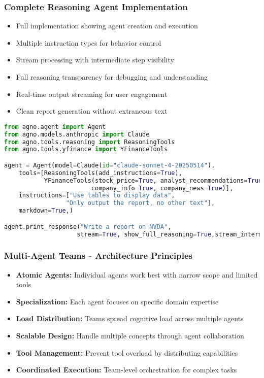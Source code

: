 \begin{frame}[fragile]\frametitle{Complete Reasoning Agent Implementation}
      \begin{itemize}
	\item Full implementation showing agent creation and execution
	\item Multiple instruction types for behavior control
	\item Stream processing with intermediate step visibility
	\item Full reasoning transparency for debugging and understanding
	\item Real-time output streaming for user engagement
	\item Clean report generation without extraneous text
	  \end{itemize}
      
      \begin{lstlisting}[language=python, basicstyle=\tiny]
from agno.agent import Agent
from agno.models.anthropic import Claude
from agno.tools.reasoning import ReasoningTools
from agno.tools.yfinance import YFinanceTools

agent = Agent(model=Claude(id="claude-sonnet-4-20250514"),
    tools=[ReasoningTools(add_instructions=True),
           YFinanceTools(stock_price=True, analyst_recommendations=True,
                        company_info=True, company_news=True)],
    instructions=["Use tables to display data",
                 "Only output the report, no other text"],
    markdown=True,)

agent.print_response("Write a report on NVDA",
                    stream=True, show_full_reasoning=True,stream_intermediate_steps=True)
      \end{lstlisting}
\end{frame}

\begin{frame}[fragile]\frametitle{Multi-Agent Teams - Architecture Principles}
      \begin{itemize}
	\item \textbf{Atomic Agents:} Individual agents work best with narrow scope and limited tools
	\item \textbf{Specialization:} Each agent focuses on specific domain expertise
	\item \textbf{Load Distribution:} Teams spread cognitive load across multiple agents
	\item \textbf{Scalable Design:} Handle multiple concepts through agent collaboration
	\item \textbf{Tool Management:} Prevent tool overload by distributing capabilities
	\item \textbf{Coordinated Execution:} Team-level orchestration for complex tasks
	  \end{itemize}
\end{frame}

